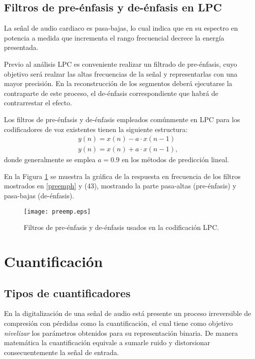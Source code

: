  \subsection{Filtros de pre-énfasis y de-énfasis en LPC}
 La señal de audio cardiaco es pasa-bajas, lo cual indica que en su espectro en potencia a medida que incrementa el rango frecuencial decrece la energía presentada. 
 
 Previo al análisis LPC es conveniente realizar un filtrado de pre-énfasis, cuyo objetivo será realzar las altas frecuencias de la señal y representarlas con una mayor precisión. En la reconstrucción de los segmentos deberá ejecutarse la contraparte de este proceso, el de-énfasis correspondiente que habrá de contrarrestar el efecto. 
 
 Los filtros de pre-énfasis y de-énfasis empleados comúnmente en LPC para los codificadores de voz existentes tienen la siguiente estructura:
 \begin{align}\label{preemph}
 	y(n) = x(n)-a\cdot x(n-1)\\
	y(n) = x(n)+a\cdot x(n-1),
 \end{align}
 donde generalmente se emplea $a=0.9$ en los métodos de predicción lineal.
 
 En la Figura \ref{preem} se muestra la gráfica de la respuesta en frecuencia de los filtros mostrados en \eqref{preemph} y (43), mostrando la parte pasa-altas (pre-énfasis) y pasa-bajas (de-énfasis).
\begin{figure}[ht]
  \centering
  \texttt{[image: preemp.eps]}
  \caption{Filtros de pre-énfasis y de-énfasis usados en la codificación LPC.}
  \label{preem}
\end{figure}
\section{Cuantificación}
\subsection{Tipos de cuantificadores}
En la digitalización de una señal de audio está presente un proceso irreversible de compresión con pérdidas como la cuantificación, el cual tiene como objetivo \emph{nivelizar} los parámetros obtenidos para su representación binaria. De manera matemática la cuantificación equivale a sumarle ruido y distorsionar consecuentemente la señal de entrada.

